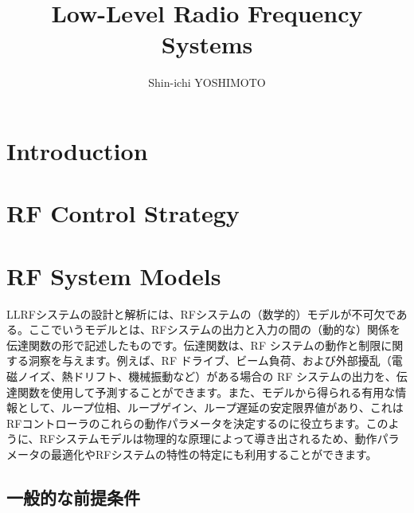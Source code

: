 \documentclass[book]{jlreq}
\begin{document}
\title{Low-Level Radio Frequency Systems}
\author{Shin-ichi YOSHIMOTO}
\maketitle
\tableofcontents

\chapter{Introduction}

\chapter{RF Control Strategy}
\chapter{RF System Models}

LLRFシステムの設計と解析には、RFシステムの（数学的）モデルが不可欠である。ここでいうモデルとは、RFシステムの出力と入力の間の（動的な）関係を伝達関数の形で記述したものです。伝達関数は、RF システムの動作と制限に関する洞察を与えます。例えば、RF ドライブ、ビーム負荷、および外部擾乱（電磁ノイズ、熱ドリフト、機械振動など）がある場合の RF システムの出力を、伝達関数を使用して予測することができます。また、モデルから得られる有用な情報として、ループ位相、ループゲイン、ループ遅延の安定限界値があり、これはRFコントローラのこれらの動作パラメータを決定するのに役立ちます。このように、RFシステムモデルは物理的な原理によって導き出されるため、動作パラメータの最適化やRFシステムの特性の特定にも利用することができます。

\section{一般的な前提条件}
\end{document}

